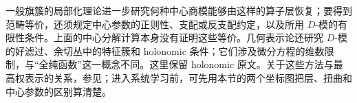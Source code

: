 \ProseParagraphBreak
一般旗簇的局部化理论进一步研究何种中心商模能够由这样的算子层恢复；要得到范畴等价，还须规定中心参数的正则性、支配或反支配约定，以及所用 \(D\)-模的有限性条件。上面的中心分解计算本身没有证明这些等价。几何表示论还研究 \(D\)-模的好滤过、余切丛中的特征簇和 holonomic 条件；它们涉及微分方程的维数限制，与“全纯函数”这一概念不同。这里保留 holonomic 原文。关于这些方法与最高权表示的关系，参见\cite[Further reading, Geometric representation theory]{Kirillov2008LieGroups}；进入系统学习前，可先用本节的两个坐标图把层、扭曲和中心参数的区别算清楚。
